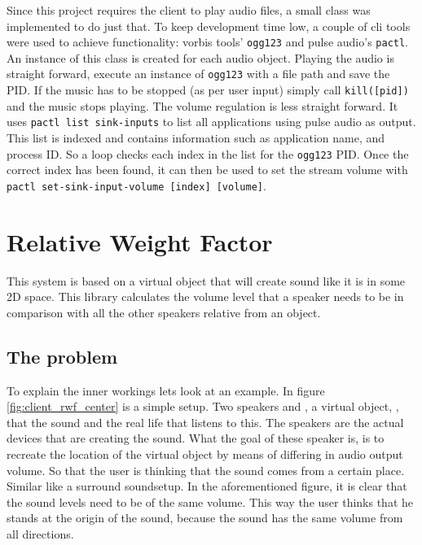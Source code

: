 Since this project requires the client to play audio files, a small class was implemented to do just that. To keep development time low, a couple of cli tools were used to achieve functionality: vorbis tools' \texttt{ogg123} and pulse audio's \texttt{pactl}. An instance of this class is created for each audio object.
Playing the audio is straight forward, execute an instance of \texttt{ogg123} with a file path and save the PID. If the music has to be stopped (as per user input) simply call \texttt{kill([pid])} and the music stops playing.
The volume regulation is less straight forward. It uses \texttt{pactl list sink-inputs} to list all applications using pulse audio as output. This list is indexed and contains information such as application name, and process ID. So a loop checks each index in the list for the \texttt{ogg123} PID. Once the correct index has been found, it can then be used to set the stream volume with \texttt{pactl set-sink-input-volume [index] [volume]}.

\section{Relative Weight Factor}
\label{sec:client_relative_weight_factor}

This system is based on a virtual object that will create sound like it is in some 2D space.
This library calculates the volume level that a speaker needs to be in comparison with all the other speakers relative from an object.

\subsection{The problem}
\label{sub:client_rwf_the_problem}

To explain the inner workings lets look at an example.
In figure \ref{fig:client_rwf_center} is a simple setup. Two speakers  and , a virtual object, , that  the sound and the real life  that listens to this.
The speakers are the actual devices that are creating the sound.
What the goal of these speaker is, is to recreate the location of the virtual object by means of differing in audio output volume.
So that the user is thinking that the sound comes from a certain place.
Similar like a surround sound\footnotemark setup.
In the aforementioned figure, it is clear that the sound levels need to be of the same volume.
This way the user thinks that he stands at the origin of the sound, because the sound has the same volume from all directions.

